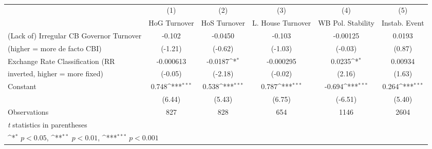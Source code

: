\begin{table}[htbp]\centering
\def\sym#1{\ifmmode^{#1}\else\(^{#1}\)\fi}
\caption{\label{lkmultIndFEDF}}
\begin{tabular}{l*{5}{c}}
\toprule
                                        &\multicolumn{1}{c}{(1)}&\multicolumn{1}{c}{(2)}&\multicolumn{1}{c}{(3)}&\multicolumn{1}{c}{(4)}&\multicolumn{1}{c}{(5)}\\
                                        &\multicolumn{1}{c}{HoG Turnover}&\multicolumn{1}{c}{HoS Turnover}&\multicolumn{1}{c}{L. House Turnover}&\multicolumn{1}{c}{WB Pol. Stability}&\multicolumn{1}{c}{Instab. Event}\\
\midrule
(Lack of) Irregular CB Governor Turnover&   -0.102         &  -0.0450         &   -0.103         & -0.00125         &   0.0193         \\
(higher = more de facto CBI)            &  (-1.21)         &  (-0.62)         &  (-1.03)         &  (-0.03)         &   (0.87)         \\
\addlinespace
Exchange Rate Classification (RR        &-0.000613         &  -0.0187\sym{*}  &-0.000295         &   0.0235\sym{*}  &  0.00934         \\
inverted, higher = more fixed)          &  (-0.05)         &  (-2.18)         &  (-0.02)         &   (2.16)         &   (1.63)         \\
\addlinespace
Constant                                &    0.748\sym{***}&    0.538\sym{***}&    0.787\sym{***}&   -0.694\sym{***}&    0.264\sym{***}\\
                                        &   (6.44)         &   (5.43)         &   (6.75)         &  (-6.51)         &   (5.40)         \\
\midrule
Observations                            &      827         &      828         &      654         &     1146         &     2604         \\
\bottomrule
\multicolumn{6}{l}{\footnotesize \textit{t} statistics in parentheses}\\
\multicolumn{6}{l}{\footnotesize \sym{*} \(p<0.05\), \sym{**} \(p<0.01\), \sym{***} \(p<0.001\)}\\
\end{tabular}
\end{table}
